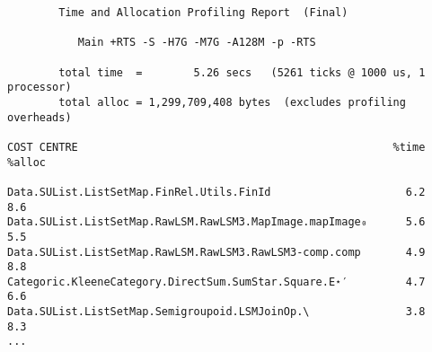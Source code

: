 \begin{verbatim}
        Time and Allocation Profiling Report  (Final)

           Main +RTS -S -H7G -M7G -A128M -p -RTS

        total time  =        5.26 secs   (5261 ticks @ 1000 us, 1 processor)
        total alloc = 1,299,709,408 bytes  (excludes profiling overheads)

COST CENTRE                                                 %time %alloc

Data.SUList.ListSetMap.FinRel.Utils.FinId                     6.2    8.6
Data.SUList.ListSetMap.RawLSM.RawLSM3.MapImage.mapImage₀      5.6    5.5
Data.SUList.ListSetMap.RawLSM.RawLSM3.RawLSM3-comp.comp       4.9    8.8
Categoric.KleeneCategory.DirectSum.SumStar.Square.E⋆′         4.7    6.6
Data.SUList.ListSetMap.Semigroupoid.LSMJoinOp.\               3.8    8.3
...
\end{verbatim}
